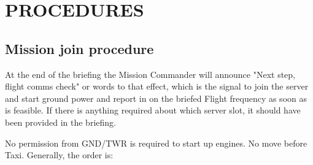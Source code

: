 \section{PROCEDURES}

\subsection{Mission join procedure}

At the end of the briefing the Mission Commander will announce "Next step,
flight comms check" or words to that effect, which is the signal to join the
server and start ground power and report in on the briefed Flight frequency as
soon as is feasible. If there is anything required about which server slot, it
should have been provided in the briefing.

No permission from GND/TWR is required to start up engines. No move before
Taxi. Generally, the order is:


